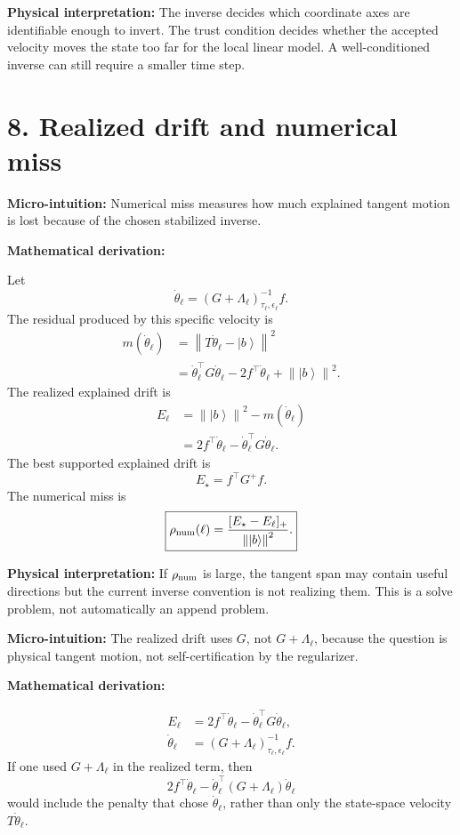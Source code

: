 \documentclass[10pt,twocolumn]{article}
\newcommand{\ket}[1]{\left|#1\right\rangle}
\newcommand{\norm}[1]{\left\lVert #1\right\rVert}
\newcommand{\micro}[1]{%
  \par\smallskip
  \noindent\textcolor{deepblue}{\textbf{Micro-intuition:}} #1
  \par\smallskip}
\newcommand{\deriv}{%
  \par\noindent\textcolor{deepviolet}{\textbf{Mathematical derivation:}}\par\vspace{-1mm}}
\newcommand{\phys}[1]{%
  \par\smallskip
  \noindent\textcolor{deepgreen}{\textbf{Physical interpretation:}} #1
  \par\smallskip}
\begin{document}
\phys{The inverse decides which coordinate axes are identifiable enough to
invert. The trust condition decides whether the accepted velocity moves the
state too far for the local linear model. A well-conditioned inverse can still
require a smaller time step.}

\section*{8. Realized drift and numerical miss}

\micro{Numerical miss measures how much explained tangent motion is lost because
of the chosen stabilized inverse.}

\deriv
Let
\[
\dot\theta_\ell=(G+\Lambda_\ell)_{\tau_\ell,\epsilon_\ell}^{-1}f.
\]
The residual produced by this specific velocity is
\[
\begin{aligned}
m(\dot\theta_\ell)
&=\norm{T\dot\theta_\ell-\ket b}^2\\
&=\dot\theta_\ell^\top G\dot\theta_\ell
-2f^\top\dot\theta_\ell+\norm{\ket b}^2.
\end{aligned}
\]
The realized explained drift is
\[
\begin{aligned}
E_\ell
&=\norm{\ket b}^2-m(\dot\theta_\ell)\\
&=2f^\top\dot\theta_\ell
-\dot\theta_\ell^\top G\dot\theta_\ell.
\end{aligned}
\]
The best supported explained drift is
\[
E_\star=f^\top G^+f.
\]
The numerical miss is
\[
\boxed{
\rho_{\rm num}(\ell)
=
\frac{[E_\star-E_\ell]_+}{\norm{\ket b}^2}.
}
\]

\phys{If \(\rho_{\rm num}\) is large, the tangent span may contain useful
directions but the current inverse convention is not realizing them. This is a
solve problem, not automatically an append problem.}

\micro{The realized drift uses \(G\), not \(G+\Lambda_\ell\), because the
question is physical tangent motion, not self-certification by the regularizer.}

\deriv
\[
\begin{aligned}
E_\ell
&=2f^\top\dot\theta_\ell-\dot\theta_\ell^\top G\dot\theta_\ell,\\
\dot\theta_\ell
&=(G+\Lambda_\ell)_{\tau_\ell,\epsilon_\ell}^{-1}f.
\end{aligned}
\]
If one used \(G+\Lambda_\ell\) in the realized term, then
\[
2f^\top\dot\theta_\ell
-\dot\theta_\ell^\top(G+\Lambda_\ell)\dot\theta_\ell
\]
would include the penalty that chose \(\dot\theta_\ell\), rather than only the
state-space velocity \(T\dot\theta_\ell\).
\end{document}
